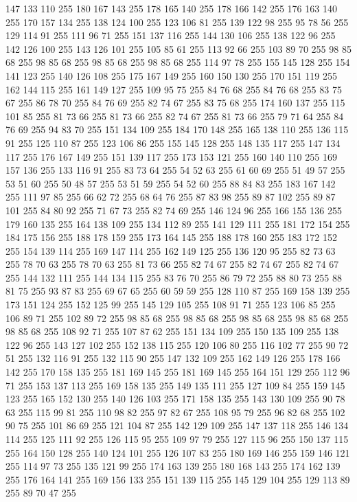 147 133 110 255 180 167 143 255 178 165 140 255 178 166 142 255 176 163 140 255 170 157 134 255 138 124 100 255 123 106 81 255 139 122 98 255 95 78 56 255 129 114 91 255 111 96 71 255 151 137 116 255 144 130 106 255 138 122 96 255 142 126 100 255 143 126 101 255 105 85 61 255 113 92 66 255 103 89 70 255 98 85 68 255 98 85 68 255 98 85 68 255 98 85 68 255 114 97 78 255 155 145 128 255 154 141 123 255 140 126 108 255 175 167 149 255 160 150 130 255 170 151 119 255 162 144 115 255 161 149 127 255 109 95 75 255 84 76 68 255 84 76 68 255 83 75 67 255 86 78 70 255 84 76 69 255 82 74 67 255 83 75 68 255 174 160 137 255 115 101 85 255 81 73 66 255 81 73 66 255 82 74 67 255 81 73 66 255 79 71 64 255 84 76 69 255 94 83 70 255 151 134 109 255 184 170 148 255 165 138 110 255 136 115 91 255 125 110 87 255 123 106 86 255 155 145 128 255 148 135 117 255 147 134 117 255 176 167 149 255 151 139 117 255 173 153 121 255 160 140 110 255 169 157 136 255
133 116 91 255 83 73 64 255 54 52 63 255 61 60 69 255 51 49 57 255 53 51 60 255 50 48 57 255 53 51 59 255 54 52 60 255 88 84 83 255 183 167 142 255 111 97 85 255 66 62 72 255 68 64 76 255 87 83 98 255 89 87 102 255 89 87 101 255 84 80 92 255 71 67 73 255 82 74 69 255 146 124 96 255 166 155 136 255 179 160 135 255 164 138 109 255 134 112 89 255 141 129 111 255 181 172 154 255 184 175 156 255 188 178 159 255 173 164 145 255 188 178 160 255 183 172 152 255 154 139 114 255 169 147 114 255 162 149 125 255 136 120 95 255 82 73 63 255 78 70 63 255 78 70 63 255 81 73 66 255 82 74 67 255 82 74 67 255 82 74 67 255 144 132 111 255 144 134 115 255 83 76 70 255 86 79 72 255 88 80 73 255 88 81 75 255 93 87 83 255 69 67 65 255 60 59 59 255 128 110 87 255 169 158 139 255 173 151 124 255 152 125 99 255 145 129 105 255 108 91 71 255 123 106 85 255 106 89 71 255 102 89 72 255 98 85 68 255 98 85 68 255 98 85 68 255
98 85 68 255 98 85 68 255 108 92 71 255 107 87 62 255 151 134 109 255 150 135 109 255 138 122 96 255 143 127 102 255 152 138 115 255 120 106 80 255 116 102 77 255 90 72 51 255 132 116 91 255 132 115 90 255 147 132 109 255 162 149 126 255 178 166 142 255 170 158 135 255 181 169 145 255 181 169 145 255 164 151 129 255 112 96 71 255 153 137 113 255 169 158 135 255 149 135 111 255 127 109 84 255 159 145 123 255 165 152 130 255 140 126 103 255 171 158 135 255 143 130 109 255 90 78 63 255 115 99 81 255 110 98 82 255 97 82 67 255 108 95 79 255 96 82 68 255 102 90 75 255 101 86 69 255 121 104 87 255 142 129 109 255 147 137 118 255 146 134 114 255 125 111 92 255 126 115 95 255 109 97 79 255 127 115 96 255 150 137 115 255 164 150 128 255 140 124 101 255 126 107 83 255 180 169 146 255 159 146 121 255 114 97 73 255 135 121 99 255 174 163 139 255 180 168 143 255 174 162 139 255 176 164 141 255 169 156 133 255 151 139 115 255 145 129 104 255 129 113 89 255 89 70 47 255
